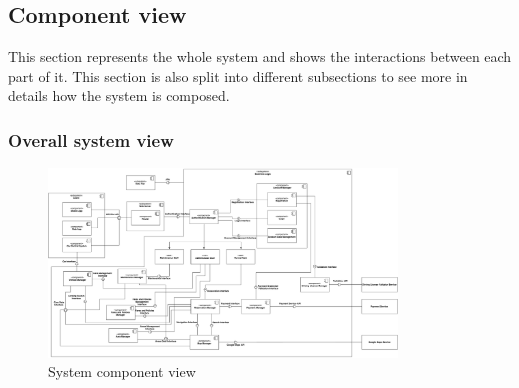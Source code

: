\subsection{Component view}

This section represents the whole system and shows the interactions between each part of it. This section is also split into different subsections to see more in details how the system is composed.

\subsubsection{Overall system view}

\begin{figure}[H]
	\includegraphics[width=350px]{../Datas/images/ComponentView.pdf}
	\caption{System component view}
	\label{fig:ComponentView}
\end{figure}

\newpage

